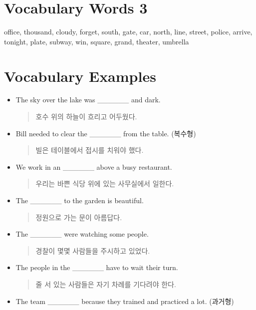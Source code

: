 \documentclass{article}
\begin{document}
\renewcommand{\familydefault}{\sfdefault}
\onehalfspacing
\fontsize{12pt}{14pt}\selectfont

\section*{Vocabulary Words 3}
\begin{addmargin}[1em]{1em}
office, thousand, cloudy, forget, south, gate, car, north, line, street, police, arrive, tonight, plate, subway, win, square, grand, theater, umbrella
\end{addmargin}

\section*{Vocabulary Examples}
\begin{addmargin}[1em]{1em}
\begin{itemize}
    \item The sky over the lake was \_\_\_\_\_\_ and dark.
    \begin{quote}
    호수 위의 하늘이 흐리고 어두웠다.
    \end{quote}
    \item Bill needed to clear the \_\_\_\_\_\_ from the table. (복수형)
    \begin{quote}
    빌은 테이블에서 접시를 치워야 했다.
    \end{quote}
    \item We work in an \_\_\_\_\_\_ above a busy restaurant.
    \begin{quote}
    우리는 바쁜 식당 위에 있는 사무실에서 일한다.
    \end{quote}
    \item The \_\_\_\_\_\_ to the garden is beautiful.
    \begin{quote}
    정원으로 가는 문이 아름답다.
    \end{quote}
    \item The \_\_\_\_\_\_ were watching some people.
    \begin{quote}
    경찰이 몇몇 사람들을 주시하고 있었다.
    \end{quote}
    \item The people in the \_\_\_\_\_\_ have to wait their turn.
    \begin{quote}
    줄 서 있는 사람들은 자기 차례를 기다려야 한다.
    \end{quote}
    \item The team \_\_\_\_\_\_ because they trained and practiced a lot. (과거형)

\end{itemize}
\end{addmargin}
\end{document}
